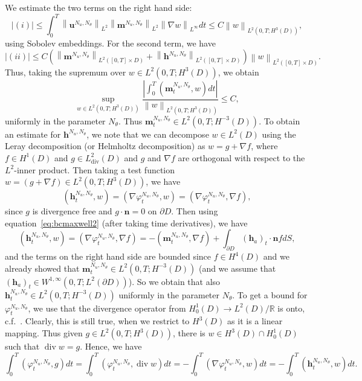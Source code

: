 \documentclass[10pt,letterpaper,twoside]{amsart}
\theoremstyle{definition}{\newtheorem{definition}[lemma]{Definition}}
\theoremstyle{note}{\newtheorem{claim}{Claim}[section]
\newtheorem*{claim*}{Claim}}
\numberwithin{equation}{section}
\newcommand{\dom}{D}
\newcommand{\norm}[1]{\left\| #1 \right\|}
\newcommand{\R}{\mathbb{R}}
\newcommand{\Grad}{\nabla}
\newcommand{\Div}{\operatorname{div}}
\newcommand{\bmb}{\mathbf{m}^{N_u,N_\theta}}
\newcommand{\bhb}{\mathbf{h}^{N_u,N_\theta}}
\newcommand{\bub}{\mathbf{u}^{N_u,N_\theta}}
\newcommand{\phb}{\varphi^{N_u,N_\theta}}
\newcommand{\bh}{\mathbf{h}}
\begin{document}
 We estimate the two terms on the right hand side:
 \begin{equation*}
 	|(i)| \leq \int_0^T \norm{\bub}_{L^2}\norm{\bmb}_{L^2}\norm{\Grad w}_{L^\infty} dt \leq C \norm{w}_{L^2(0,T;H^3(\dom))}, 
 \end{equation*}
 using Sobolev embeddings. For the second term, we have
 \begin{equation*}
 	|(ii)|\leq C(\norm{\bmb}_{L^2([0,T]\times\dom)}+\norm{\bhb}_{L^2([0,T]\times\dom)})\norm{w}_{L^2([0,T]\times\dom)}.
 \end{equation*}
 Thus, taking the supremum over $w\in L^2(0,T;H^3(\dom))$, we obtain
 \begin{equation}\label{eq:mtimecont}
 	\sup_{w\in L^2(0,T;H^3(\dom))}\frac{ \left| \int_0^T (\bmb_t,w) dt \right|}{\norm{w}_{L^2(0,T;H^3(\dom))}} \leq C,
 \end{equation}
 uniformly in the parameter  $N_\theta$. Thus $\bmb_t\in L^2(0,T; H^{-3}(\dom))$. To obtain an estimate for $\bhb$, we note that we can decompose $w\in L^2(\dom)$ using the Leray decomposition (or Helmholtz decomposition) as $w =g + \Grad f$, where $f\in H^1(\dom)$ and $g\in L^2_{\text{div}}(\dom)$ and $g$ and $\Grad f$ are orthogonal with respect to the $L^2$-inner product. Then taking a test function $w=(g+\Grad f)\in L^2(0,T;H^3(\dom))$, we have
 \begin{equation*}
 	(\bhb_t,w) = (\Grad\phb_t,w) = (\Grad\phb_t, \Grad f),
 \end{equation*}
 since $g$ is divergence free and $g\cdot\mathbf{n}=0$ on $\partial\dom$.
Then using  equation~\eqref{eq:bcmaxwell2} (after taking time derivatives), we have
 \begin{equation*}
 	(\bhb_t,w) = (\Grad\phb_t,\Grad f) = -(\bmb_t,\Grad f)+\int_{\partial\dom} (\bh_a)_t\cdot \mathbf{n} f dS,
 \end{equation*}
 and the terms on the right hand side are bounded since $f\in H^4(\dom)$ and we already showed that $\bmb_t\in L^2(0,T;H^{-3}(\dom))$ (and we assume that $(\bh_a)_t\in W^{1,\infty}(0,T;L^2(\partial\dom))$). So we obtain that also $\bhb_t\in L^2(0,T;H^{-3}(\dom))$ uniformly in the parameter  $ N_\theta$.  To get a bound for $\phb_t$, we use that the divergence operator from $H^1_0(\dom)\to L^2(\dom)/\R$ is onto, c.f.~\cite[Lemma 2.4, Chapter 1]{Temam2001}. Clearly, this is still true, when we restrict to $H^3(\dom)$ as it is a linear mapping. Thus given $g\in L^2(0,T;H^3(\dom))$, there is $w\in H^3(\dom)\cap H^1_0(\dom)$ such that $\Div w =g$. Hence, we have
 \begin{equation}\label{eq:phitimederivative}
 \int_0^T (\phb_t,g) dt = \int_0^T (\phb_t,\Div w)dt = -\int_0^T (\Grad\phb_t,w)dt = -\int_0^T(\bhb_t,w)dt.
  \end{equation}
\end{document}
